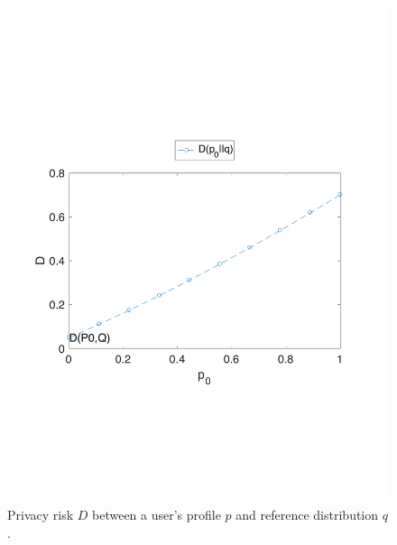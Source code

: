 \begin{figure}[htb]
\centering
\includegraphics[scale=0.5]{figures/example_2_D.pdf}
\caption{Privacy risk $D$ between a user's profile $p$ and reference distribution $q$.}
\label{fig:5}
\end{figure}

